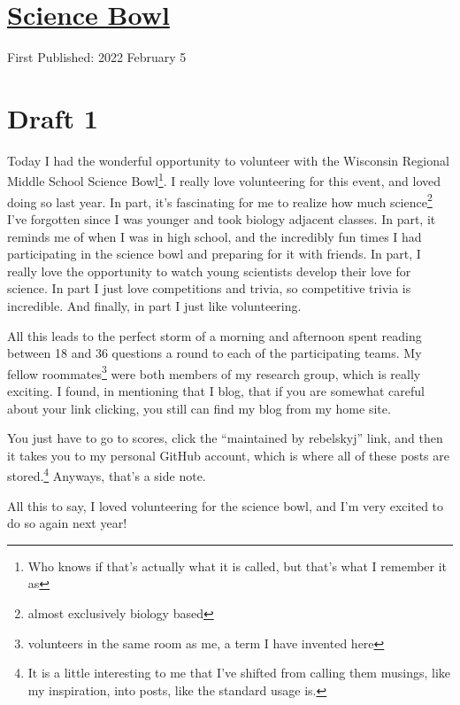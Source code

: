 \documentclass[12pt]{article}[titlepage]
\newcommand{\say}[1]{``#1''}
\renewcommand{\,}{\textsuperscript{,}}
\begin{document}
\doublespacing
\section{\href{science-bowl.html}{Science Bowl}}
First Published: 2022 February 5

\section{Draft 1}
Today I had the wonderful opportunity to volunteer with the Wisconsin Regional Middle School Science Bowl\footnote{Who knows if that's actually what it is called, but that's what I remember it as}.
I really love volunteering for this event, and loved doing so last year.
In part, it's fascinating for me to realize how much science\footnote{almost exclusively biology based} I've forgotten since I was younger and took biology adjacent classes.
In part, it reminds me of when I was in high school, and the incredibly fun times I had participating in the science bowl and preparing for it with friends.
In part, I really love the opportunity to watch young scientists develop their love for science.
In part I just love competitions and trivia, so competitive trivia is incredible.
And finally, in part I just like volunteering.

All this leads to the perfect storm of a morning and afternoon spent reading between 18 and 36 questions a round to each of the participating teams.
My fellow roommates\footnote{volunteers in the same room as me, a term I have invented here} were both members of my research group, which is really exciting.
I found, in mentioning that I blog, that if you are somewhat careful about your link clicking, you still can find my blog from my home site.

You just have to go to scores, click the \say{maintained by rebelskyj} link, and then it takes you to my personal GitHub account, which is where all of these posts are stored.\footnote{It is a little interesting to me that I've shifted from calling them musings, like my inspiration, into posts, like the standard usage is.}
Anyways, that's a side note.

All this to say, I loved volunteering for the science bowl, and I'm very excited to do so again next year!
\end{document}
